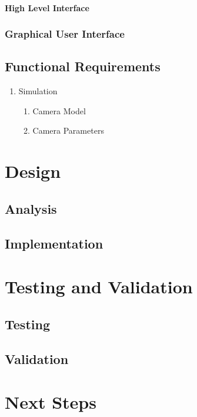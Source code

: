 \documentclass[11pt]{report}
\begin{document}
\subsubsection{High Level Interface}

\subsection{Graphical User Interface}


\section{Functional Requirements}

\begin{enumerate}
\item Simulation
\begin{enumerate}
	\item Camera Model
	\item Camera Parameters 
\end{enumerate}
\end{enumerate}

\chapter{Design}

\section{Analysis}

\section{Implementation}

\chapter{Testing and Validation}

\section{Testing}

\section{Validation}

\chapter{Next Steps}

\printglossaries

{}
\end{document}
